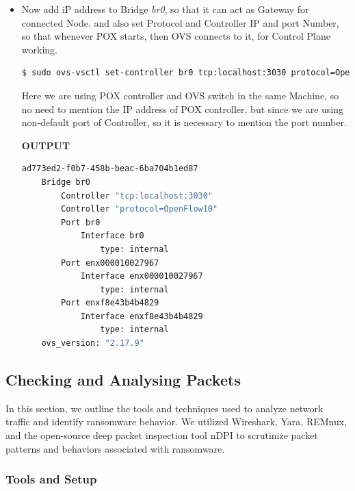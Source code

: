 \documentclass[12pt,letterpaper]{article}
\begin{document}
\begin{enumerate}
\begin{itemize}[label=$\rightarrow$]
    \item Now add iP address to Bridge \textit{br0}, so that it can act as Gateway for connected Node. and also set Protocol and Controller IP and port Number, so that whenever POX starts, then OVS connects to it, for Control Plane working.

\begin{lstlisting}[language=bash]
    $ sudo ovs-vsctl set-controller br0 tcp:localhost:3030 protocol=OpenFlow10
\end{lstlisting} 

Here we are using POX controller and OVS switch in the same Machine, so no need to mention the IP address of POX controller, but since we are using non-default port of Controller, so it is necessary to mention the port number.

\textbf{OUTPUT}

\begin{lstlisting}[language=bash]
    ad773ed2-f0b7-458b-beac-6ba704b1ed87
    Bridge br0
        Controller "tcp:localhost:3030"
        Controller "protocol=OpenFlow10"
        Port br0
            Interface br0
                type: internal
        Port enx000010027967
            Interface enx000010027967
                type: internal
        Port enxf8e43b4b4829
            Interface enxf8e43b4b4829
                type: internal
    ovs_version: "2.17.9"

\end{lstlisting}   

    \end{itemize}    
    \end{enumerate}


        \subsection{Checking and Analysing Packets}
            \label{Checking and Analysing Packets}


            In this section, we outline the tools and techniques used to analyze network traffic and identify ransomware behavior. We utilized Wireshark, Yara, REMnux, and the open-source deep packet inspection tool nDPI to scrutinize packet patterns and behaviors associated with ransomware.

        \subsubsection{Tools and Setup}
\end{document}
